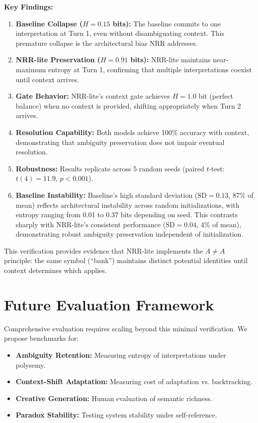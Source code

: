 \documentclass[11pt,a4paper]{article}
\begin{document}
\textbf{Key Findings:}
\begin{enumerate}
    \item \textbf{Baseline Collapse ($H = 0.15$ bits):} The baseline commits to one interpretation at Turn 1, even without disambiguating context. This premature collapse is the architectural bias NRR addresses.
    \item \textbf{NRR-lite Preservation ($H = 0.91$ bits):} NRR-lite maintains near-maximum entropy at Turn 1, confirming that multiple interpretations coexist until context arrives.
    \item \textbf{Gate Behavior:} NRR-lite's context gate achieves $H = 1.0$ bit (perfect balance) when no context is provided, shifting appropriately when Turn 2 arrives.
    \item \textbf{Resolution Capability:} Both models achieve 100\% accuracy with context, demonstrating that ambiguity preservation does not impair eventual resolution.
    \item \textbf{Robustness:} Results replicate across 5 random seeds (paired $t$-test: $t(4) = 11.9$, $p < 0.001$).
    \item \textbf{Baseline Instability:} Baseline's high standard deviation ($\text{SD} = 0.13$, 87\% of mean) reflects architectural instability across random initializations, with entropy ranging from 0.01 to 0.37 bits depending on seed. This contrasts sharply with NRR-lite's consistent performance ($\text{SD} = 0.04$, 4\% of mean), demonstrating robust ambiguity preservation independent of initialization.
\end{enumerate}

This verification provides evidence that NRR-lite implements the $A \neq A$ principle: the same symbol (``bank'') maintains distinct potential identities until context determines which applies.

\section{Future Evaluation Framework}

Comprehensive evaluation requires scaling beyond this minimal verification.
We propose benchmarks for:
\begin{itemize}
    \item \textbf{Ambiguity Retention:} Measuring entropy of interpretations under polysemy.
    \item \textbf{Context-Shift Adaptation:} Measuring cost of adaptation vs. backtracking.
    \item \textbf{Creative Generation:} Human evaluation of semantic richness.
    \item \textbf{Paradox Stability:} Testing system stability under self-reference.
\end{itemize}
\end{document}
